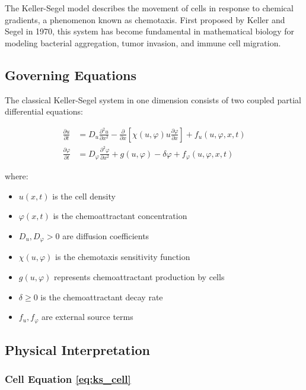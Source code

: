 \documentclass[11pt,a4paper]{article}
\begin{document}
The Keller-Segel model describes the movement of cells in response to chemical gradients, a phenomenon known as chemotaxis. First proposed by Keller and Segel in 1970, this system has become fundamental in mathematical biology for modeling bacterial aggregation, tumor invasion, and immune cell migration.

\subsection{Governing Equations}

The classical Keller-Segel system in one dimension consists of two coupled partial differential equations:

\begin{align}
\frac{\partial u}{\partial t} &= D_u \frac{\partial^2 u}{\partial x^2} - \frac{\partial}{\partial x}\left[\chi(u,\varphi) u \frac{\partial \varphi}{\partial x}\right] + f_u(u,\varphi,x,t) \label{eq:ks_cell}\\
\frac{\partial \varphi}{\partial t} &= D_\varphi \frac{\partial^2 \varphi}{\partial x^2} + g(u,\varphi) - \delta\varphi + f_\varphi(u,\varphi,x,t) \label{eq:ks_chemical}
\end{align}

where:
\begin{itemize}
    \item $u(x,t)$ is the cell density
    \item $\varphi(x,t)$ is the chemoattractant concentration
    \item $D_u, D_\varphi > 0$ are diffusion coefficients
    \item $\chi(u,\varphi)$ is the chemotaxis sensitivity function
    \item $g(u,\varphi)$ represents chemoattractant production by cells
    \item $\delta \geq 0$ is the chemoattractant decay rate
    \item $f_u, f_\varphi$ are external source terms
\end{itemize}

\subsection{Physical Interpretation}

\subsubsection{Cell Equation \eqref{eq:ks_cell}}
\end{document}
